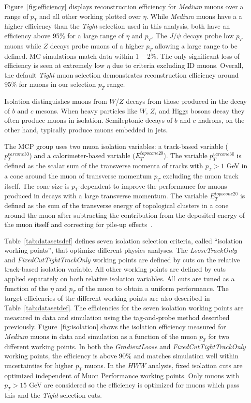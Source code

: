 Figure~\ref{fig:efficiency} displays reconstruction efficiency for \textit{Medium} muons over a range of $p_T$ and all other working plotted over $\eta$. While \textit{Medium} muons have a a higher efficiency than the \textit{Tight} selection used in this analysis, both have an efficiency above 95\% for a large range of $\eta$ and $p_T$. The $J/\psi$ decays probe low $p_T$ muons while $Z$ decays probe muons of a higher $p_T$ allowing a large range to be defined. MC simulations match data within $1-2\%$. The only significant loss of efficiency is seen at extremely low $\eta$ due to criteria excluding ID muons. Overall, the default \textit{Tight} muon selection demonstrates reconstruction efficiency around $95\%$ for muons in our selection $p_T$ range.

Isolation distinguishes muons from $W$/$Z$ decays from those produced in the decay of $b$ and $c$ mesons. When heavy particles like $W$, $Z$, and Higgs bosons decay they often produce muons in isolation. Semileptonic decays of $b$ and $c$ hadrons, on the other hand, typically produce muons embedded in jets.

The MCP group uses two muon isolation variables: a track-based variable ($p_T^{varcone30}$) and a calorimeter-based variable ($E_T^{topocone20}$). The variable $p_T^{varcone30}$ is defined as the scalar sum of the transverse momenta of tracks with $p_T > 1$ GeV in a cone around the muon of transverse momentum $p_T$ excluding the muon track itself. The cone size is $p_T$-dependent to improve the performance for muons produced in decays with a large transverse momentum. The variable $E_T^{topocone20}$ is defined as the sum of the transverse energy of topological clusters in a cone around the muon after subtracting the contribution from the deposited energy of the muon itself and correcting for pile-up effects~\cite{jets}. 

Table~\ref{tab:datasetsdef} defines seven isolation selection criteria, called ``isolation working points'', that optimize different physics analyses. The \textit{LooseTrackOnly} and \textit{FixedCutTightTrackOnly} working points are defined by cuts on the relative track-based isolation variable. All other working points are defined by cuts applied separately on both relative isolation variables. All cuts are tuned as a function of the $\eta$ and $p_T$ of the muon to obtain a uniform performance. The target efficiencies of the different working points are also described in Table~\ref{tab:datasetdef}. The efficiencies for the seven isolation working points are measured in data and simulation using the tag-and-probe method described previously. Figure~\ref{fig:isolation} shows the isolation efficiency measured for \textit{Medium} muons in data and simulation as a function of the muon $p_T$ for two different working points. In both the \textit{GradientLoose} and \textit{FixedCutTightTrackOnly} working points, the efficiency is above $90\%$ and matches simulation well within uncertainties for higher $p_T$ muons. In the $HWW$ analysis, fixed isolation cuts are optimized independent of Muon Performance working points. Only muons with $p_T>15$ GeV are considered so the efficiency is optimized for muons which pass this and the \textit{Tight} selection cuts.  

